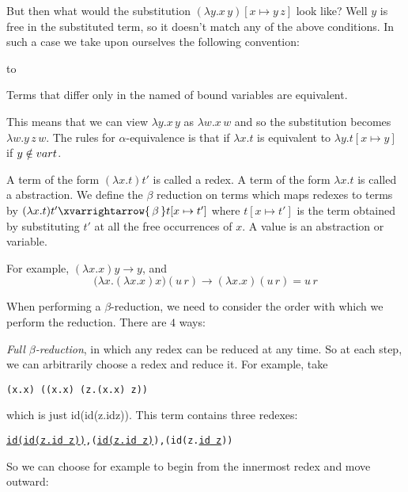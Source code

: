 \edefn

But then what would the substitution $(\lambda y.x\,y)[x\mapsto y\,z]$ look like?
Well $y$ is free in the substituted term, so it doesn't match any of the above conditions.
In such a case we take upon ourselves the following convention:

\hbox to
\medskip

    Terms that differ only in the named of bound variables are equivalent.

\eppbox

This means that we can view $\lambda y.x\,y$ as $\lambda w.x\,w$ and so the substitution becomes $\lambda w.y\,z\,w$.
The rules for $\alpha$-equivalence is that if $\lambda x.t$ is equivalent to $\lambda y.t[x\mapsto y]$ if $y\notin{\sl var} t$. 

\bdefn

    A term of the form $(\lambda x.t)t'$ is called a {\emphcolor redex}.
    A term of the form $\lambda x.t$ is called a {\emphcolor abstraction}.
    We define the {\emphcolor $\beta$ reduction} on terms which maps redexes to terms by $(\lambda x.t)t'\xvarrightarrow{\,\beta\,}t[x\mapsto t']$ where $t[x\mapsto t']$ is the term
    obtained by substituting $t'$ at all the free occurrences of $x$.
    A {\emphcolor value} is an abstraction or variable.

\edefn

For example, $(\lambda x.x)y\to y$, and
$$ \bigl(\lambda x.(\lambda x.x)x\bigr)(u\,r) \to (\lambda x.x)(u\,r) = u\,r $$

When performing a $\beta$-reduction, we need to consider the order with which we perform the reduction.
There are $4$ ways:
\def\id{{\sf id}}
\benum
    \item {\it Full $\beta$-reduction}, in which any redex can be reduced at any time.
        So at each step, we can arbitrarily choose a redex and reduce it.
        For example, take

        \centerline{\tt (\lambda x.x) ((\lambda x.x) (\lambda z.(\lambda x.x) z))}

        which is just \id(\id(\lambda z.\id z)).
        This term contains three redexes:

        \centerline{\tt\underline{\id(\id(\lambda z.\id\ z))},\quad \id(\underline{\id(\lambda z.\id\ z)}),\quad \id(\id(\lambda z.\underline{\id\ z}))}

        So we can choose for example to begin from the innermost redex and move outward:

